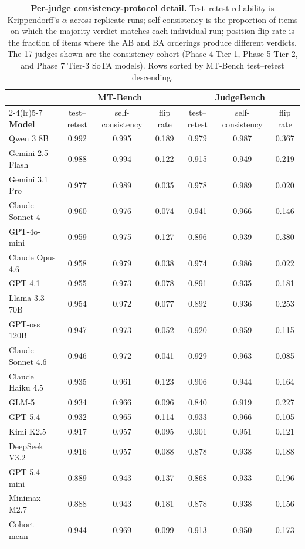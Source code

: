 \begin{table}[!t]
\centering
\small
\setlength{\tabcolsep}{4pt}
\begin{tabular}{lcccccc}
\toprule
& \multicolumn{3}{c}{\textbf{MT-Bench}} & \multicolumn{3}{c}{\textbf{JudgeBench}} \\
\cmidrule(lr){2-4}\cmidrule(lr){5-7}
\textbf{Model} & test--retest & self-consistency & flip rate & test--retest & self-consistency & flip rate \\
\midrule
Qwen 3 8B         & 0.992 & 0.995 & 0.189 & 0.979 & 0.987 & 0.367 \\
Gemini 2.5 Flash  & 0.988 & 0.994 & 0.122 & 0.915 & 0.949 & 0.219 \\
Gemini 3.1 Pro    & 0.977 & 0.989 & 0.035 & 0.978 & 0.989 & 0.020 \\
Claude Sonnet 4   & 0.960 & 0.976 & 0.074 & 0.941 & 0.966 & 0.146 \\
GPT-4o-mini       & 0.959 & 0.975 & 0.127 & 0.896 & 0.939 & 0.380 \\
Claude Opus 4.6   & 0.958 & 0.979 & 0.038 & 0.974 & 0.986 & 0.022 \\
GPT-4.1           & 0.955 & 0.973 & 0.078 & 0.891 & 0.935 & 0.181 \\
Llama 3.3 70B     & 0.954 & 0.972 & 0.077 & 0.892 & 0.936 & 0.253 \\
GPT-oss 120B      & 0.947 & 0.973 & 0.052 & 0.920 & 0.959 & 0.115 \\
Claude Sonnet 4.6 & 0.946 & 0.972 & 0.041 & 0.929 & 0.963 & 0.085 \\
Claude Haiku 4.5  & 0.935 & 0.961 & 0.123 & 0.906 & 0.944 & 0.164 \\
GLM-5             & 0.934 & 0.966 & 0.096 & 0.840 & 0.919 & 0.227 \\
GPT-5.4           & 0.932 & 0.965 & 0.114 & 0.933 & 0.966 & 0.105 \\
Kimi K2.5         & 0.917 & 0.957 & 0.095 & 0.901 & 0.951 & 0.121 \\
DeepSeek V3.2     & 0.916 & 0.957 & 0.088 & 0.878 & 0.938 & 0.188 \\
GPT-5.4-mini      & 0.889 & 0.943 & 0.137 & 0.868 & 0.933 & 0.196 \\
Minimax M2.7      & 0.888 & 0.943 & 0.181 & 0.878 & 0.938 & 0.156 \\
\midrule
Cohort mean       & 0.944 & 0.969 & 0.099 & 0.913 & 0.950 & 0.173 \\
\bottomrule
\end{tabular}
\caption{\textbf{Per-judge consistency-protocol detail.} Test--retest
reliability is Krippendorff's $\alpha$ across replicate runs;
self-consistency is the proportion of items on which the majority
verdict matches each individual run; position flip rate is the
fraction of items where the AB and BA orderings produce different
verdicts. The 17 judges shown are the consistency cohort (Phase 4
Tier-1, Phase 5 Tier-2, and Phase 7 Tier-3 SoTA models). Rows sorted
by MT-Bench test--retest descending.}
\label{app:consistency-table}
\end{table}

